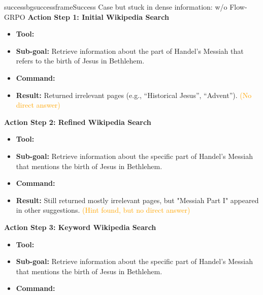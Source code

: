 \begin{small}
\begin{center}
\begin{casebox}{successbg}{successframe}{Success Case but stuck in dense information: \model w/o Flow-GRPO}
    \textbf{Action Step 1: Initial Wikipedia Search}
    \begin{itemize}[nosep, leftmargin=*]
        \item \textbf{Tool:} 
        \item \textbf{Sub-goal:} Retrieve information about the part of Handel's Messiah that refers to the birth of Jesus in Bethlehem.
        \item \textbf{Command:}

        \item \textbf{Result:} Returned irrelevant pages (e.g., ``Historical Jesus'', ``Advent''). \textcolor{orange}{(No direct answer)}
    \end{itemize}

    \vspace{1em}

    \textbf{Action Step 2: Refined Wikipedia Search}
    \begin{itemize}[nosep, leftmargin=*]
        \item \textbf{Tool:} 
        \item \textbf{Sub-goal:} Retrieve information about the specific part of Handel's Messiah that mentions the birth of Jesus in Bethlehem.
        \item \textbf{Command:}

        \item \textbf{Result:} Still returned mostly irrelevant pages, but "Messiah Part I" appeared in other suggestions. \textcolor{orange}{(Hint found, but no direct answer)}
    \end{itemize}

    \vspace{1em}

    \textbf{Action Step 3: Keyword Wikipedia Search}
    \begin{itemize}[nosep, leftmargin=*]
        \item \textbf{Tool:} 
        \item \textbf{Sub-goal:} Retrieve information about the specific part of Handel's Messiah that mentions the birth of Jesus in Bethlehem.
        \item \textbf{Command:}


\end{itemize}
\end{casebox}
\end{center}
\end{small}

